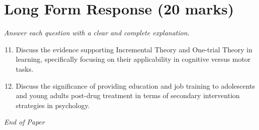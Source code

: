 \documentclass[12pt]{article}
\begin{document}
\section*{Long Form Response (20 marks)}
\textit{Answer each question with a clear and complete explanation.}
\begin{enumerate}[label=\arabic*.]
\setcounter{enumi}{10}
\item Discuss the evidence supporting Incremental Theory and One-trial Theory in learning, specifically focusing on their applicability in cognitive versus motor tasks.
\item Discuss the significance of providing education and job training to adolescents and young adults post-drug treatment in terms of secondary intervention strategies in psychology.
\end{enumerate}

\vfill
\noindent\textit{End of Paper}
\end{document}
